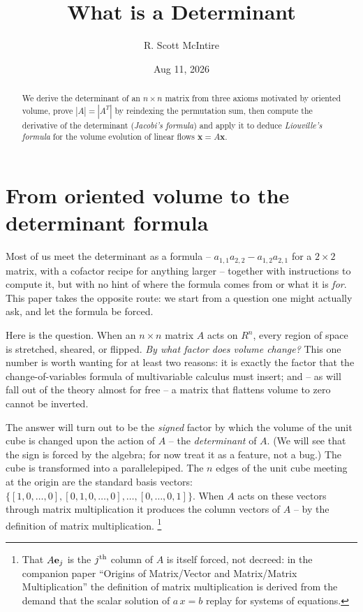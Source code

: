\documentclass{article}
\title{What is a Determinant}
\author{R. Scott McIntire}
\date{Aug 11, 2026}
\begin{document}
\maketitle

\begin{abstract}
We derive the determinant of an $n \times n$ matrix from three axioms
motivated by oriented volume, prove $|A| = |A^T|$ by reindexing the
permutation sum, then compute the derivative of the determinant
({\em Jacobi's formula\/}) and apply it to deduce {\em Liouville's
formula\/} for the volume evolution of linear flows
$\dot{\mathbf{x}} = A \mathbf{x}$.
\end{abstract}

\section{From oriented volume to the determinant formula}
Most of us meet the determinant as a formula -- $a_{1,1} a_{2,2} - a_{1,2} a_{2,1}$
for a $2 \times 2$ matrix, with a cofactor recipe for anything larger -- together
with instructions to compute it, but with no hint of where the formula comes from
or what it is {\em for\/}. This paper takes the opposite route: we start from a
question one might actually ask, and let the formula be forced.

Here is the question. When an $n \times n$ matrix $A$ acts on $R^n$, every region
of space is stretched, sheared, or flipped. {\em By what factor does volume
change?\/} This one number is worth wanting for at least two reasons: it is
exactly the factor that the change-of-variables formula of multivariable calculus
must insert; and -- as will fall out of the theory almost for free -- a matrix
that flattens volume to zero cannot be inverted.

The answer will turn out to be the {\em signed\/} factor by which
the volume of the unit cube is changed upon the action of $A$ -- the
{\em determinant\/} of $A$. (We will see
that the sign is forced by the algebra; for now treat it as a feature, not a bug.)
The cube is transformed into a parallelepiped. The $n$ edges of the unit cube
meeting at the origin are the standard basis vectors:
$\{ [1, 0, \ldots, 0], [0, 1, 0, \ldots, 0], \ldots, [0, \ldots, 0, 1]\}$.
When $A$ acts on these vectors through matrix multiplication it
produces the column vectors of $A$ -- by the definition of matrix multiplication.%
\footnote{That $A {\bf e}_j$ is the $j^{\rm th}$ column of $A$ is itself forced,
not decreed: in the companion paper ``Origins of Matrix/Vector and Matrix/Matrix
Multiplication'' the definition of matrix multiplication is derived from the
demand that the scalar solution of $a\,x = b$ replay for systems of equations.}
\end{document}
